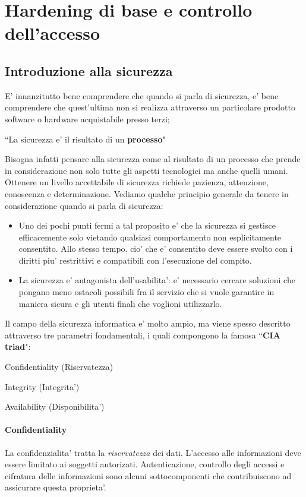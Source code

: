 \section{Hardening di base e controllo dell'accesso}

\subsection{Introduzione alla sicurezza}
E' innanzitutto bene comprendere che quando si parla di sicurezza, e' bene comprendere che quest'ultima non si realizza attraverso un particolare prodotto software o hardware acquistabile presso terzi;
\begin{center}
	``La sicurezza e' il risultato di un \textbf{processo}"
\end{center}
Bisogna infatti pensare alla sicurezza come al risultato di un processo che prende in considerazione non solo tutte gli aspetti tecnologici ma anche quelli umani. Ottenere un livello accettabile di sicurezza richiede pazienza, attenzione, conoscenza e determinazione. Vediamo qualche principio generale da tenere in considerazione quando si parla di sicurezza:
\begin{itemize}
	\item Uno dei pochi punti fermi a tal proposito e' che la sicurezza si gestisce efficacemente solo vietando qualsiasi comportamento non esplicitamente consentito. Allo stesso tempo. cio' che e' consentito deve essere svolto con i diritti piu' restrittivi e compatibili con l'esecuzione del compito.
	\item La sicurezza e' antagonista dell'usabilita': e' necessario cercare soluzioni che pongano meno ostacoli possibili fra il servizio che si vuole garantire in maniera sicura e gli utenti finali che voglioni utilizzarlo.
\end{itemize}
Il campo della sicurezza informatica e' molto ampio, ma viene spesso descritto attraverso tre parametri fondamentali, i quali compongono la famosa ``\textbf{CIA triad}":
\begin{center}
	\item Confidentiality (Riservatezza)
	\item Integrity (Integrita')
	\item Availability (Disponibilita')
\end{center}

\paragraph{Confidentiality} 
La confidenzialita' tratta la \emph{riservatezza} dei dati. L'accesso alle informazioni deve essere limitato ai soggetti autorizati. Autenticazione, controllo degli accessi e cifratura delle informazioni sono alcuni sottocomponenti che contribuiscono ad assicurare questa proprieta'.

